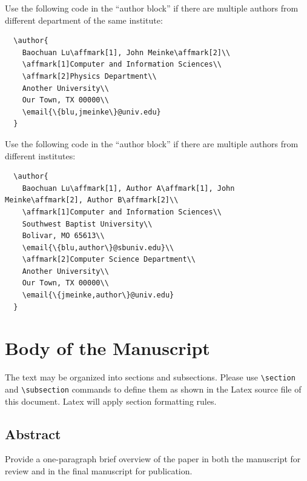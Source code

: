 \documentclass{article}
\begin{document}
Use the following code in the ``author block'' if there are multiple authors from different department of the same institute:

\begin{lstlisting}
  \author{
    Baochuan Lu\affmark[1], John Meinke\affmark[2]\\
    \affmark[1]Computer and Information Sciences\\
    \affmark[2]Physics Department\\
    Another University\\
    Our Town, TX 00000\\
    \email{\{blu,jmeinke\}@univ.edu}
  }
\end{lstlisting}

Use the following code in the ``author block'' if there are multiple authors from different institutes:
\begin{lstlisting}
  \author{
    Baochuan Lu\affmark[1], Author A\affmark[1], John Meinke\affmark[2], Author B\affmark[2]\\
    \affmark[1]Computer and Information Sciences\\
    Southwest Baptist University\\
    Bolivar, MO 65613\\
    \email{\{blu,author\}@sbuniv.edu}\\
    \affmark[2]Computer Science Department\\
    Another University\\
    Our Town, TX 00000\\
    \email{\{jmeinke,author\}@univ.edu}
  }
\end{lstlisting}

\section{Body of the Manuscript}
The text may be organized into sections and subsections. Please use
\verb+\section+ and  \verb+\subsection+ commands to define them as shown in the
Latex source file of this document. Latex will apply section formatting rules.

\subsection{Abstract}
Provide a one-paragraph brief overview of the paper in both the manuscript for
review and in the final manuscript for publication.
\end{document}

